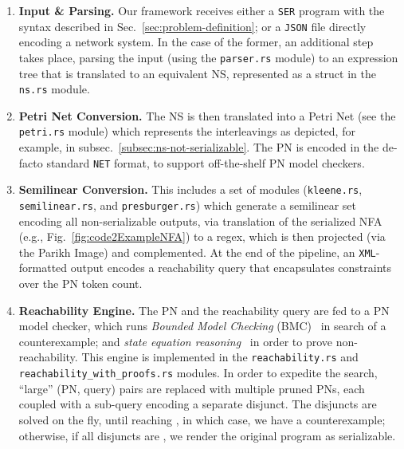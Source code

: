 \begin{enumerate}
	\item \textbf{Input \& Parsing.} 
	Our framework receives either a \texttt{SER} program with the syntax described in Sec.~\ref{sec:problem-definition}; or a \texttt{JSON} file directly encoding a network system. In the case of the former, an additional step takes place, parsing the input (using the \texttt{parser.rs} module) to an expression tree that is translated to an equivalent NS, represented as a struct in the \texttt{ns.rs} module. 
	
	\item \textbf{Petri Net Conversion.} The NS is then translated into a Petri Net (see the \texttt{petri.rs} module) which represents the interleavings as depicted, for example, in subsec.~\ref{subsec:ns-not-serializable}.
The PN is encoded in the de-facto standard \texttt{NET} format, to support off-the-shelf PN model checkers. 
	
	\item \textbf{Semilinear Conversion.} 
	This includes a set of modules (\texttt{kleene.rs}, \texttt{semilinear.rs}, and \texttt{presburger.rs}) which generate a semilinear set encoding all non-serializable outputs, via translation of the serialized NFA (e.g., Fig.~\ref{fig:code2ExampleNFA}) to a regex, which is then projected (via the Parikh Image) and complemented. 
	At the end of the pipeline, an \texttt{XML}-formatted output encodes a reachability query that encapsulates constraints over the PN token count.
	
	
	\item \textbf{Reachability Engine.} The PN and the reachability query are fed to a  PN model checker, which runs \textit{Bounded Model Checking} (BMC)~\cite{BiCiClZh99} in search of a counterexample; and \textit{state equation reasoning}~\cite{Mu77} in order to prove non-reachability. This engine is implemented in the \texttt{reachability.rs} and \texttt{reachability\_with\_proofs.rs}  modules.
	In order to expedite the search, ``large'' (PN, query) pairs are replaced with multiple pruned PNs, each coupled with a sub-query encoding a separate disjunct. 
The disjuncts are solved on the fly, until reaching \sat, in which case, we have a counterexample; otherwise, if all disjuncts are \unsat, we render the original program as serializable.
	

\end{enumerate}
